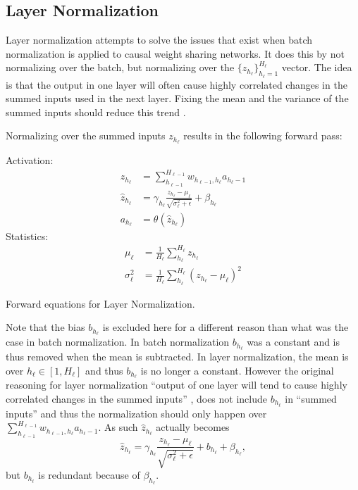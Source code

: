 \clearpage
\subsection{Layer Normalization}

Layer normalization attempts to solve the issues that exist when batch normalization is applied to causal weight sharing networks. It does this by not normalizing over the batch, but normalizing over the $\{z_{h_\ell}\}_{h_\ell=1}^{H_\ell}$ vector. The idea is that the output in one layer will often cause highly correlated changes in the summed inputs used in the next layer. Fixing the mean and the variance of the summed inputs should reduce this trend \cite{layer-normalization}.

Normalizing over the summed inputs $z_{h_\ell}$ results in the following forward pass:
\begin{equationbox}[H]
Activation:
\begin{equation*}
\begin{aligned}
z_{h_\ell} &= \sum_{h_{\ell-1}}^{H_{\ell-1}} w_{h_{\ell-1},h_\ell} a_{h_\ell-1} \\
\hat{z}_{h_\ell} &= \gamma_{h_\ell} \frac{z_{h_\ell} - \mu_{\ell}}{\sqrt{\sigma_{\ell}^2 + \epsilon}} + \beta_{h_\ell} \\
a_{h_\ell} &= \theta\left(\hat{z}_{h_\ell}\right)
\end{aligned}
\end{equation*}
Statistics:
\begin{equation*}
\begin{aligned}
\mu_{\ell} &= \frac{1}{H_\ell} \sum_{h_\ell}^{H_\ell} z_{h_\ell} \\
\sigma_{\ell}^2 &= \frac{1}{H_\ell} \sum_{h_\ell}^{H_\ell} (z_{h_\ell} - \mu_{\ell})^2
\end{aligned}
\end{equation*}
\caption{Forward equations for Layer Normalization.}
\end{equationbox}

Note that the bias $b_{h_\ell}$ is excluded here for a different reason than what was the case in batch normalization. In batch normalization $b_{h_\ell}$ was a constant and is thus removed when the mean is subtracted. In layer normalization, the mean is over $h_\ell \in [1, H_\ell]$ and thus $b_{h_\ell}$ is no longer a constant. However the original reasoning for layer normalization ``output of one layer will tend to cause highly correlated changes in the summed inputs'' \cite{layer-normalization}, does not include $b_{h_\ell}$ in ``summed inputs'' and thus the normalization should only happen over $\sum_{h_{\ell-1}}^{H_{\ell-1}} w_{h_{\ell-1},h_\ell} a_{h_\ell-1}$. As such $\hat{z}_{h_\ell}$ actually becomes
\begin{equation*}
\hat{z}_{h_\ell} = \gamma_{h_\ell} \frac{z_{h_\ell} - \mu_{\ell}}{\sqrt{\sigma_{\ell}^2 + \epsilon}} + b_{h_\ell} + \beta_{h_\ell},
\end{equation*}
but $b_{h_\ell}$ is redundant because of $\beta_{h_\ell}$.

